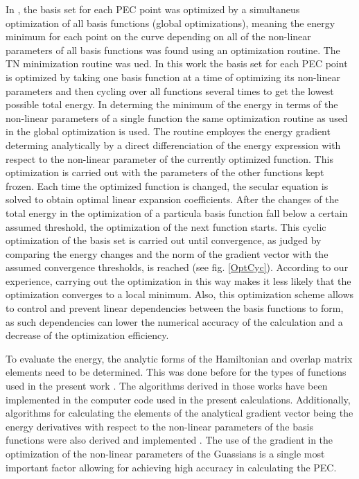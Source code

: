 \documentclass[aps,onecolumn]{revtex4}
\begin{document}
In \cite{HeH+_Wei2012}, the basis set for each PEC point was optimized 
by a simultaneus optimization of all basis functions (global optimizations), 
meaning the energy minimum 
for each point on the curve
depending on all of the non-linear parameters of all basis functions was found 
using an optimization
routine. The TN minimization routine \cite{TN} was ued. 
In this work the basis set for each PEC point is optimized 
by taking one basis function at a time of optimizing its non-linear parameters and
then cycling over all functions several times to get the lowest possible total energy.
In determing the minimum of the energy in terms of the non-linear parameters of a single function 
the same optimization routine as used in the global optimization is used.
The routine employes the energy gradient determing analytically by a direct differenciation 
of the energy expression with respect to the non-linear parameter of the currently
optimized function. This optimization is carried
out with the parameters of the other functions kept frozen. 
Each time the optimized function is changed, the secular equation is solved 
to obtain optimal linear expansion coefficients. After the changes of the total energy
in the optimization of a particula basis function
fall below a certain assumed threshold, the optimization of
the next function starts. This cyclic optimization of the basis set is carried out until
convergence, as judged by comparing the energy changes and 
the norm of the gradient vector with the assumed convergence thresholds,
is reached (see fig. \ref{OptCyc}). 
According to our experience,
carrying out the optimization in this way makes it less
likely that the optimization converges to a local minimum.
Also, this optimization scheme allows to control and prevent linear dependencies
between the basis functions to form, as such dependencies can lower the
numerical accuracy of the calculation and a decrease of the optimization efficiency.

To evaluate the energy, the analytic forms of the Hamiltonian and overlap matrix elements
need to be determined.
This was done before for the types of functions used in the present
work \cite{Theory5, Theory6, Theory7}. The algorithms derived in those
works have been implemented
in the computer code used in the present calculations. 
Additionally, algorithms for
calculating the elements of the analytical gradient vector
being the energy derivatives with respect to the non-linear parameters of
the basis functions were also derived and implemented \cite{Theory5}.
The use of the gradient in the optimization of the non-linear parameters
of the Guassians is a single most important factor allowing for 
achieving high accuracy in calculating the PEC.
\end{document}
